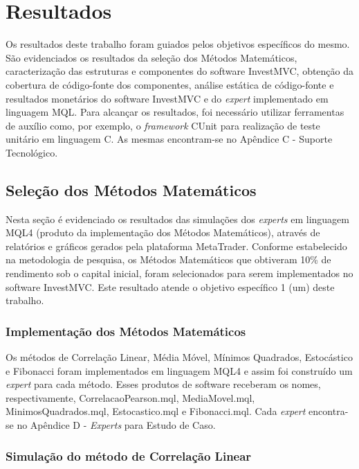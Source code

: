 \chapter{Resultados}

Os resultados deste trabalho foram guiados pelos objetivos específicos do mesmo. São evidenciados os resultados da seleção dos Métodos Matemáticos, caracterização das estruturas e componentes do software InvestMVC, obtenção da cobertura de código-fonte dos componentes, análise estática de código-fonte e resultados monetários do software InvestMVC e do \textit{expert} implementado em linguagem MQL. Para alcançar os resultados, foi necessário utilizar ferramentas de auxílio como, por exemplo, o \textit{framework} CUnit  para realização de teste unitário em linguagem C. As mesmas encontram-se no Apêndice C - Suporte Tecnológico.

\section{Seleção dos Métodos Matemáticos}

Nesta seção é evidenciado os resultados  das simulações dos \textit{experts} em linguagem MQL4 (produto da implementação dos Métodos Matemáticos), através de relatórios e gráficos gerados pela plataforma MetaTrader. Conforme estabelecido na metodologia de pesquisa, os Métodos Matemáticos que obtiveram 10\% de rendimento sob o capital inicial, foram selecionados para serem implementados no software InvestMVC. Este resultado atende o objetivo específico 1 (um) deste trabalho.

\subsection{Implementação dos Métodos Matemáticos}

Os métodos de Correlação Linear, Média Móvel, Mínimos Quadrados, Estocástico e Fibonacci foram implementados em linguagem MQL4 e assim foi construído um \textit{expert} para cada método. Esses produtos de software receberam os nomes, respectivamente, CorrelacaoPearson.mql, MediaMovel.mql, MinimosQuadrados.mql, Estocastico.mql e Fibonacci.mql. Cada \textit{expert} encontra-se no Apêndice D - \textit{Experts} para Estudo de Caso.

\subsection{Simulação do método de Correlação Linear}

